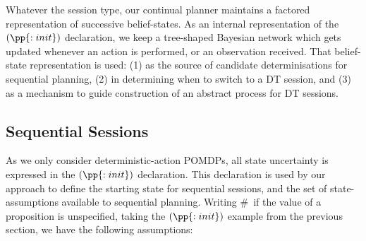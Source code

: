 
Whatever the session type, our continual planner maintains a factored
representation of successive belief-states.
As an internal representation of the $(\pp{:init})$
declaration, we keep a tree-shaped Bayesian network which gets updated
whenever an action is performed, or an observation received. That
belief-state representation is used: (1) as the source of candidate
determinisations for sequential planning, (2) in determining when to
switch to a DT session, and (3) as a mechanism to guide construction
of an abstract process for DT sessions.

\subsection{Sequential Sessions}

As we only consider deterministic-action POMDPs, all state
uncertainty is expressed in the $(\pp{:init})$ declaration. This
declaration is used by our approach to define the starting state for
sequential sessions, and the set of state-assumptions available to
sequential planning.  Writing \#\ if the value of a proposition is
unspecified, taking the $(\pp{:init})$ example from the previous
section, we have the following assumptions:

